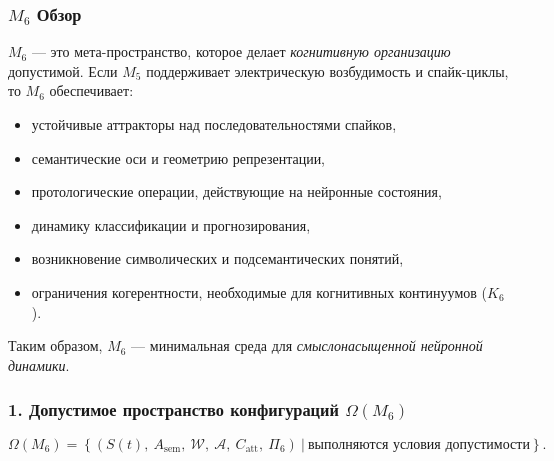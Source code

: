 

\subsubsection{\texorpdfstring{$M_6$}{M_6} Обзор}
\label{sec:m6-overview}

$M_6$ — это мета-пространство, которое делает \emph{когнитивную организацию} допустимой.
Если $M_5$ поддерживает электрическую возбудимость и спайк-циклы, то $M_6$ обеспечивает:

\begin{itemize}
    \item устойчивые аттракторы над последовательностями спайков,
    \item семантические оси и геометрию репрезентации,
    \item протологические операции, действующие на нейронные состояния,
    \item динамику классификации и прогнозирования,
    \item возникновение символических и подсемантических понятий,
    \item ограничения когерентности, необходимые для когнитивных континуумов ($K_6$).
\end{itemize}

Таким образом, $M_6$ — минимальная среда для \emph{смыслонасыщенной нейронной динамики}.

\subsubsection*{1. Допустимое пространство конфигураций \texorpdfstring{$\Omega(M_6)$}{\Omega(M_6)}}

\[
\Omega(M_6) =
\left\{
(S(t),\ A_{\mathrm{sem}},\
\mathcal{W},\
\mathcal{A},\
C_{\mathrm{att}},\
\Pi_6)
\ \big|\ \text{выполняются условия допустимости}
\right\}.
\]

